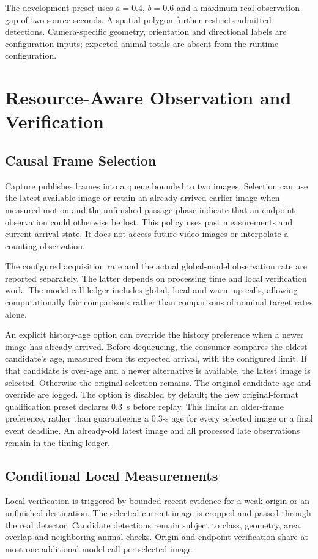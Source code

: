 \documentclass[journal]{IEEEtran}
\begin{document}
The development preset uses $a=0.4$, $b=0.6$ and a maximum real-observation gap of two source seconds. A spatial polygon further restricts admitted detections. Camera-specific geometry, orientation and directional labels are configuration inputs; expected animal totals are absent from the runtime configuration.

\section{Resource-Aware Observation and Verification}
\subsection{Causal Frame Selection}
Capture publishes frames into a queue bounded to two images. Selection can use the latest available image or retain an already-arrived earlier image when measured motion and the unfinished passage phase indicate that an endpoint observation could otherwise be lost. This policy uses past measurements and current arrival state. It does not access future video images or interpolate a counting observation.

The configured acquisition rate and the actual global-model observation rate are reported separately. The latter depends on processing time and local verification work. The model-call ledger includes global, local and warm-up calls, allowing computationally fair comparisons rather than comparisons of nominal target rates alone.

An explicit history-age option can override the history preference when a newer image has already arrived. Before dequeueing, the consumer compares the oldest candidate's age, measured from its expected arrival, with the configured limit. If that candidate is over-age and a newer alternative is available, the latest image is selected. Otherwise the original selection remains. The original candidate age and override are logged. The option is disabled by default; the new original-format qualification preset declares 0.3~s before replay. This limits an older-frame preference, rather than guaranteeing a 0.3-s age for every selected image or a final event deadline. An already-old latest image and all processed late observations remain in the timing ledger.

\subsection{Conditional Local Measurements}
Local verification is triggered by bounded recent evidence for a weak origin or an unfinished destination. The selected current image is cropped and passed through the real detector. Candidate detections remain subject to class, geometry, area, overlap and neighboring-animal checks. Origin and endpoint verification share at most one additional model call per selected image.
\end{document}
